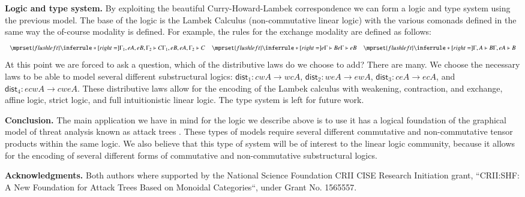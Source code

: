 \documentclass{article}
\let\mto\to
\let\to\relax
\newcommand{\to}{\rightarrow}
\begin{document}
\textbf{Logic and type system.} By exploiting the beautiful
Curry-Howard-Lambek correspondence we can form a logic and type system
using the previous model.  The base of the logic is the Lambek
Calculus (non-commutative linear logic) with the various comonads
defined in the same way the of-course modality is defined.  For
example, the rules for the exchange modality are defined as follows:
\vspace{-7px}
\[
\small
\begin{array}{cccccccccccccc}
  $$\mprset{flushleft}
  \inferrule* [right=] {
    \Gamma_1,eA,eB,\Gamma_2 \vdash C
  }{\Gamma_1,eB,eA,\Gamma_2 \vdash C}
  &
  $$\mprset{flushleft}
  \inferrule* [right=] {
    e\Gamma \vdash B
  }{e\Gamma \vdash eB}
  &
  $$\mprset{flushleft}
  \inferrule* [right=] {
    \Gamma,A \vdash B
  }{\Gamma,eA \vdash B}
\end{array}
\vspace{-7px}
\]
At this point we are forced to ask a question, which of the
distributive laws do we choose to add?  There are many.  We choose the
necessary laws to be able to model several different substructural
logics: $\mathsf{dist}_1 : cwA \mto wcA$, $\mathsf{dist}_2 : weA \mto
ewA$, $\mathsf{dist}_3 : ceA \mto ecA$, and $\mathsf{dist}_4 : ecwA
\mto cweA$.  These distributive laws allow for the encoding of the
Lambek calculus with weakening, contraction, and exchange, affine
logic, strict logic, and full intuitionistic linear logic.  The type
system is left for future work.

\textbf{Conclusion.}  The main application we have in mind for the
logic we describe above is to use it has a logical foundation of the
graphical model of threat analysis known as attack trees
\cite{Eades:2016a}.  These types of models require several different
commutative and non-commutative tensor products within the same logic.
We also believe that this type of system will be of interest to the
linear logic community, because it allows for the encoding of
several different forms of commutative and non-commutative
substructural logics.

\textbf{Acknowledgments.} Both authors where supported by the National
Science Foundation CRII CISE Research Initiation grant, ``CRII:SHF: A
New Foundation for Attack Trees Based on Monoidal Categories``, under
Grant No. 1565557.

\vspace{-15px}
 
\end{document}
